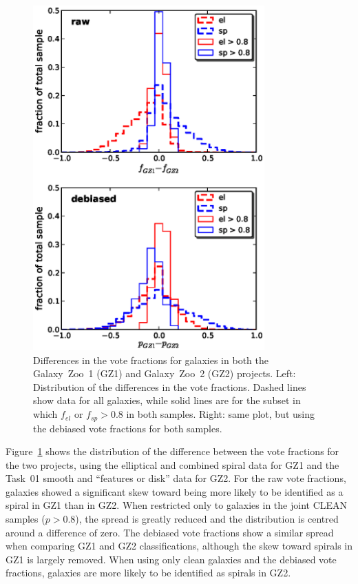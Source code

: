 \documentclass[useAMS,usenatbib]{mn2e}
\begin{document}
\begin{figure}
\includegraphics[angle=0,width=3.5in]{figures/gz1_gz2.eps}
\caption{Differences in the vote fractions for galaxies in both the Galaxy~Zoo~1 (GZ1) and Galaxy~Zoo~2 (GZ2) projects. Left: Distribution of the differences in the vote fractions. Dashed lines show data for all galaxies, while solid lines are for the subset in which $f_{el}$ or $f_{sp} > 0.8$ in both samples. Right: same plot, but using the debiased vote fractions for both samples. 
\label{fig-gz1_gz2}}
\end{figure}

Figure~\ref{fig-gz1_gz2} shows the distribution of the difference between the vote fractions for the two projects, using the elliptical and combined spiral data for GZ1 and the Task~01 smooth and ``features or disk'' data for GZ2. For the raw vote fractions, galaxies showed a significant skew toward being more likely to be identified as a spiral in GZ1 than in GZ2. When restricted only to galaxies in the joint CLEAN samples ($p>0.8$), the spread is greatly reduced and the distribution is centred around a difference of zero. The debiased vote fractions show a similar spread when comparing GZ1 and GZ2 classifications, although the skew toward spirals in GZ1 is largely removed. When using only clean galaxies and the debiased vote fractions, galaxies are more likely to be identified as spirals in GZ2. 
\end{document}
